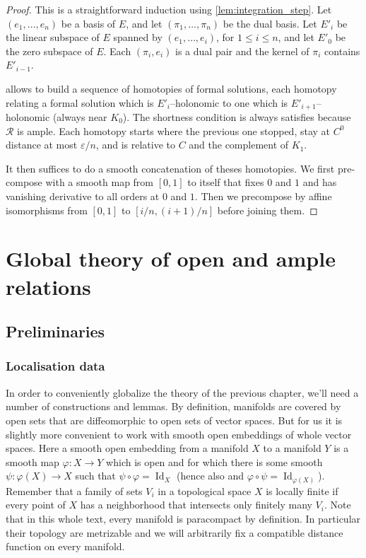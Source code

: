 \documentclass[10pt,a4paper]{article}
\newcounter{chapter}
\newcommand{\Rel}{\mathcal{R}} %
\DeclareMathOperator{\Id}{Id}
\newcommand{\uses}[1]{}
\newcommand{\leanok}{}
\begin{document}
\begin{proof}
  \leanok
  \uses{lem:integration_step}
  This is a straightforward induction using \cref{lem:integration_step}.
  Let $(e_1, \dots, e_n)$ be a basis of $E$,
  and let $(π_1, \dots, π_n)$ be the dual basis.
  Let $E'_i$ be the linear subspace of $E$ spanned by
  $(e_1, \dots, e_i)$, for $1 ≤ i ≤ n$, and let $E'_0$ be the zero
  subspace of $E$.
  Each $(π_i, e_i)$ is a dual pair and the kernel of $π_i$ contains
  $E'_{i - 1}$.

   allows to build a sequence of homotopies
  of formal solutions,
  each homotopy relating a formal solution which is $E'_i$--holonomic to
  one which is $E'_{i+1}$--holonomic (always near $K_0$).
  The shortness condition is always satisfies because $\Rel$ is
  ample.
  Each homotopy starts where the previous one stopped, stay at
  $C^0$ distance at most $ε/n$, and is relative to $C$ and
  the complement of $K_1$.

  It then suffices to do a smooth concatenation of theses homotopies.
  We first pre-compose with a smooth map from $[0, 1]$ to itself that
  fixes $0$ and $1$ and has vanishing derivative to all orders at $0$
  and $1$.
  Then we precompose by affine isomorphisms from $[0, 1]$
  to $[i/n, (i + 1)/n]$ before joining them.
\end{proof}



\chapter{Global theory of open and ample relations}
\label{chap:global}

\section{Preliminaries}

\subsection{Localisation data}%
\label{sub:localisation_data}

In order to conveniently globalize the theory of the previous chapter, we'll
need a number of constructions and lemmas. By definition, manifolds are covered
by open sets that are diffeomorphic to open sets of vector spaces. But for us it is
slightly more convenient to work with smooth open embeddings of whole vector spaces.
Here a smooth open embedding from a manifold $X$ to a manifold $Y$ is a smooth map
$φ : X → Y$ which is open and for which there is some smooth $ψ : φ(X) → X$ such that
$ψ ∘ φ = \Id_X$ (hence also and $φ ∘ ψ = \Id_{φ(X)}$).
Remember that a family of sets $V_i$ in a topological space $X$ is locally finite if
every point of $X$ has a neighborhood that intersects only finitely many $V_i$.
Note that in this whole text, every manifold is paracompact by definition. In
particular their topology are metrizable and we will arbitrarily fix a
compatible distance function on every manifold.
\end{document}
